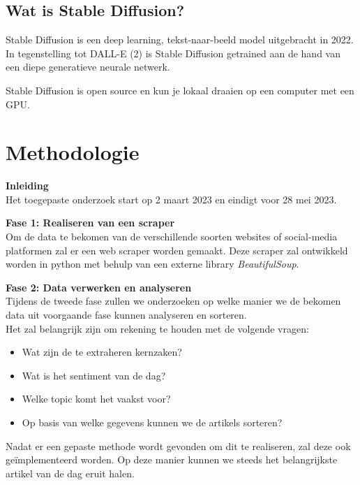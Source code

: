 \subsection{Wat is Stable Diffusion?}
\noindent
Stable Diffusion is een deep learning, tekst-naar-beeld model uitgebracht in 2022. In tegenstelling tot DALL-E (2) is Stable Diffusion getrained aan de hand van een diepe generatieve neurale netwerk.
\autocite{StableDifWikipediaEN}

Stable Diffusion is open source en kun je lokaal draaien op een computer met een GPU.



\section{Methodologie}%
\label{sec:methodologie}
\noindent
\textbf{Inleiding} \\
Het toegepaste onderzoek start op 2 maart 2023 en eindigt voor 28 mei 2023.

\noindent
\textbf{Fase 1: Realiseren van een scraper} \\
Om de data te bekomen van de verschillende soorten websites of social-media platformen zal er een web scraper worden gemaakt. Deze scraper zal ontwikkeld worden in python met behulp van een externe library \emph{BeautifulSoup}.

\noindent
\textbf{Fase 2: Data verwerken en analyseren} \\
Tijdens de tweede fase zullen we onderzoeken op welke manier we de bekomen data uit voorgaande fase kunnen analyseren en sorteren. \\
\noindent
Het zal belangrijk zijn om rekening te houden met de volgende vragen: 
\begin{itemize}
    \item Wat zijn de te extraheren kernzaken?
    \item Wat is het sentiment van de dag? 
    \item Welke topic komt het vaakst voor?
    \item Op basis van welke gegevens kunnen we de artikels sorteren? 
\end{itemize}

\noindent
Nadat er een gepaste methode wordt gevonden om dit te realiseren, zal deze ook geïmplementeerd worden. Op deze manier kunnen we steeds het belangrijkste artikel van de dag eruit halen. \\

